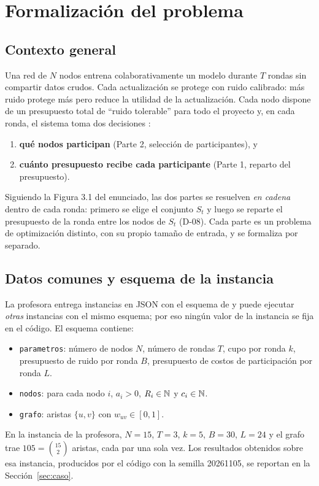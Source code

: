 \section{Formalización del problema}\label{sec:formalizacion}

\subsection{Contexto general}
Una red de $N$ nodos entrena colaborativamente un modelo durante $T$ rondas sin compartir datos crudos. Cada actualización se protege con ruido calibrado: más ruido protege más pero reduce la utilidad de la actualización. Cada nodo dispone de un presupuesto total de ``ruido tolerable'' para todo el proyecto y, en cada ronda, el sistema toma dos decisiones \cite{enunciado}:
\begin{enumerate}[label=(\alph*)]
\item \textbf{qué nodos participan} (Parte 2, selección de participantes), y
\item \textbf{cuánto presupuesto recibe cada participante} (Parte 1, reparto del presupuesto).
\end{enumerate}
Siguiendo la Figura 3.1 del enunciado, las dos partes se resuelven \emph{en cadena} dentro de cada ronda: primero se elige el conjunto $S_t$ y luego se reparte el presupuesto de la ronda entre los nodos de $S_t$ (D-08). Cada parte es un problema de optimización distinto, con su propio tamaño de entrada, y se formaliza por separado.

\subsection{Datos comunes y esquema de la instancia}\label{sec:datos}
La profesora entrega instancias en JSON con el esquema de  y puede ejecutar \emph{otras} instancias con el mismo esquema; por eso ningún valor de la instancia se fija en el código. El esquema contiene:
\begin{itemize}[leftmargin=*]
\item \texttt{parametros}: número de nodos $N$, número de rondas $T$, cupo por ronda $k$, presupuesto de ruido por ronda $B$, presupuesto de costos de participación por ronda $L$.
\item \texttt{nodos}: para cada nodo $i$,  $a_i>0$,  $R_i\in\mathbb{N}$ y  $c_i\in\mathbb{N}$.
\item \texttt{grafo}: aristas $\{u,v\}$ con  $w_{uv}\in[0,1]$.
\end{itemize}
En la instancia de la profesora, $N=15$, $T=3$, $k=5$, $B=30$, $L=24$ y el grafo trae $105=\binom{15}{2}$ aristas, cada par una sola vez. Los resultados obtenidos sobre esa instancia, producidos por el código con la semilla 20261105, se reportan en la Sección~\ref{sec:caso}.

